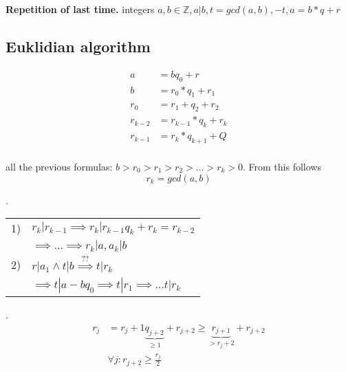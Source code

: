 

\textbf{Repetition of last time.}
integers $a,b \in \mathbb{Z}, a|b, t = gcd(a,b), -t, a = b*q + r$

\subsection{Euklidian algorithm}
\begin{align*}
  a &= b q_0 +r \\
  b &= r_0*q_1 + r_1 \\
  r_0 &= r_1 + q_2 + r_2\\
  r_{k-2} &= r_{k-1} * q_k + r_k \\
  r_{k-1} &= r_{k} * q_{k+1} + Q \\
\end{align*}

all the previous formulas: $ b > r_0 > r_1 > r_2 > \ldots > r_k > 0$. From this follows
\[
  r_k = gcd(a,b)
\]

\Proof. \\
\begin{tabular}{ll}
  1) & $r_k | r_{k-1} \implies r_k | r_{k-1} q_k + r_k = r_{k-2}$ \\
     & $\implies \ldots \implies r_k | a, a_k | b$ \\
  2) & $r | a_1 \wedge t | b \stackrel{\text{??}}{\implies} t| r_k$ \\
     & $\implies t | a-bq_0 \implies t | r_1 \implies \ldots t|r_k$
\end{tabular}


\Remark.
\begin{align*}
  r_j &= r_j + 1 \underbrace{q_{j+2}}_{ \geq 1} + r_{j+2} \geq \underbrace{r_{j+1}}_{ > r_j+2} + r_{j+2} \\
      & \forall j: r_{j+2} \geq \frac{r_j}{2}
\end{align*}

